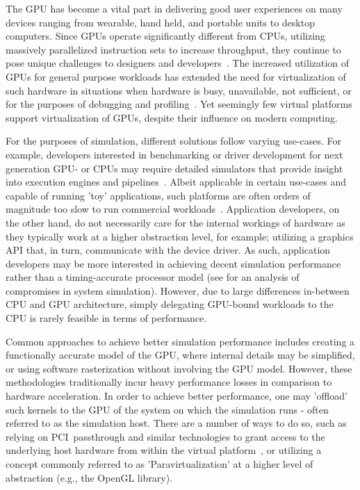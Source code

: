The GPU has become a vital part in delivering good user experiences on many devices ranging from wearable, hand held, and portable units to desktop computers.
Since GPUs operate significantly different from CPUs, utilizing massively parallelized instruction sets to increase throughput, they continue to pose unique challenges to designers and developers~.
The increased utilization of GPUs for general purpose workloads has extended the need for virtualization of such hardware in situations when hardware is busy, unavailable, not sufficient, or for the purposes of debugging and profiling~.
Yet seemingly few virtual platforms support virtualization of GPUs, despite their influence on modern computing.

For the purposes of simulation, different solutions follow varying use-cases.
For example, developers interested in benchmarking or driver development for next generation GPU- or CPUs may require detailed simulators that provide insight into execution engines and pipelines~.
Albeit applicable in certain use-cases and capable of running 'toy' applications, such platforms are often orders of magnitude too slow to run commercial workloads~.
Application developers, on the other hand, do not necessarily care for the internal workings of hardware as they typically work at a higher abstraction level, for example; utilizing a graphics API that, in turn, communicate with the device driver.
As such, application developers may be more interested in achieving decent simulation performance rather than a timing-accurate processor model (see  for an analysis of compromises in system simulation).
However, due to large differences in-between CPU and GPU architecture, simply delegating GPU-bound workloads to the CPU is rarely feasible in terms of performance.

Common approaches to achieve better simulation performance includes creating a functionally accurate model of the GPU, where internal details may be simplified, or using software rasterization without involving the GPU model.
However, these methodologies traditionally incur heavy performance losses in comparison to hardware acceleration.
In order to achieve better performance, one may 'offload' such kernels to the GPU of the system on which the simulation runs - often referred to as the simulation host.
There are a number of ways to do so, such as relying on PCI~passthrough and similar technologies to grant access to the underlying host hardware from within the virtual platform~, or utilizing a concept commonly referred to as 'Paravirtualization' at a higher level of abstraction (e.g., the OpenGL library).


